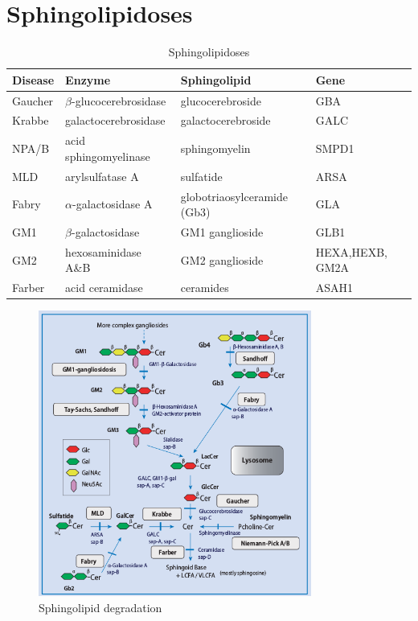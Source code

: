 \documentclass[12pt]{scrartcl}
\begin{document}
\section{Sphingolipidoses}
\label{sec:orge8195c7}

\begin{table}[htbp]
\caption{\label{tab:org8b31d19}Sphingolipidoses}
\centering
\begin{tabular}{llll}
Disease & Enzyme & Sphingolipid & Gene\\
\hline
Gaucher & \(\beta\)-glucocerebrosidase & glucocerebroside & GBA\\
Krabbe & galactocerebrosidase & galactocerebroside & GALC\\
NPA/B & acid sphingomyelinase & sphingomyelin & SMPD1\\
MLD & arylsulfatase A & sulfatide & ARSA\\
Fabry & \(\alpha\)-galactosidase A & globotriaosylceramide (Gb3) & GLA\\
GM1 & \(\beta\)-galactosidase & GM1 ganglioside & GLB1\\
GM2 & hexosaminidase A\&B & GM2 ganglioside & HEXA,HEXB, GM2A\\
Farber & acid ceramidase & ceramides & ASAH1\\
\end{tabular}
\end{table}

\begin{figure}[htbp]
\centering
\includegraphics[width=0.8\textwidth]{./figures/sl_degradation.png}
\caption{\label{fig:org96ffffe}Sphingolipid degradation}
\end{figure}
\end{document}

